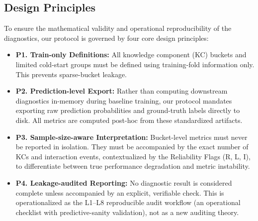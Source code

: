 \subsection{Design Principles}
\label{sec:principles}
To ensure the mathematical validity and operational reproducibility of the diagnostics, our protocol is governed by four core design principles:
\begin{itemize}
    \item \textbf{P1. Train-only Definitions:} All knowledge component (KC) buckets and limited cold-start groups must be defined using training-fold information only. This prevents sparse-bucket leakage.
    \item \textbf{P2. Prediction-level Export:} Rather than computing downstream diagnostics in-memory during baseline training, our protocol mandates exporting raw prediction probabilities and ground-truth labels directly to disk. All metrics are computed post-hoc from these standardized artifacts.
    \item \textbf{P3. Sample-size-aware Interpretation:} Bucket-level metrics must never be reported in isolation. They must be accompanied by the exact number of KCs and interaction events, contextualized by the Reliability Flags (R, L, I), to differentiate between true performance degradation and metric instability.
    \item \textbf{P4. Leakage-audited Reporting:} No diagnostic result is considered complete unless accompanied by an explicit, verifiable check. This is operationalized as the L1--L8 reproducible audit workflow (an operational checklist with predictive-sanity validation), not as a new auditing theory.
\end{itemize}
